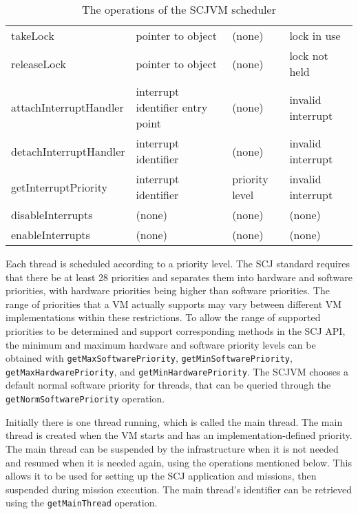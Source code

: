 \documentclass[a4paper,10pt]{report}
\begin{document}
\begin{table}[ht]
\begin{tabular}{|l|p{3cm}|p{2.2cm}|p{2.7cm}|}
    \\takeLock &
    pointer to object &
    (none) &
    lock in use
    \\releaseLock &
    pointer to object &
    (none) &
    lock not held
    \\attachInterruptHandler &
    interrupt identifier \newline
    entry point &
    (none) &
    invalid interrupt
    \\detachInterruptHandler &
    interrupt identifier &
    (none) &
    invalid interrupt
    \\getInterruptPriority &
    interrupt identifier &
    priority level &
    invalid interrupt
    \\disableInterrupts &
    (none) &
    (none) &
    (none)
    \\enableInterrupts &
    (none) &
    (none) &
    (none)
  \end{tabular}
  \caption{The operations of the SCJVM scheduler}
  \label{scheduler-table}
\end{table}

Each thread is scheduled according to a priority level.
The SCJ standard requires that there be at least 28 priorities and
separates them into hardware and software priorities, with hardware
priorities being higher than software priorities.
The range of priorities that a VM actually supports may vary between
different VM implementations within these restrictions.
To allow the range of supported priorities to be determined and
support corresponding methods in the SCJ API, the minimum and maximum
hardware and software priority levels can be obtained with
\texttt{get\-Max\-Soft\-ware\-Pri\-or\-ity},
\texttt{get\-Min\-Soft\-ware\-Pri\-or\-ity},
\texttt{get\-Max\-Hard\-ware\-Pri\-or\-ity}, and
\texttt{get\-Min\-Hard\-ware\-Pri\-or\-ity}.
The SCJVM chooses a default normal software priority for threads, that
can be queried through the
\texttt{get\-Norm\-Soft\-ware\-Pri\-or\-ity} operation.

Initially there is one thread running, which is called the main
thread.
The main thread is created when the VM starts and has an
implementation-defined priority.
The main thread can be suspended by the infrastructure when it is not
needed and resumed when it is needed again, using the operations
mentioned below.
This allows it to be used for setting up the SCJ application and
missions, then suspended during mission execution.
The main thread's identifier can be retrieved using the
\texttt{get\-Main\-Thread} operation.
\end{document}
